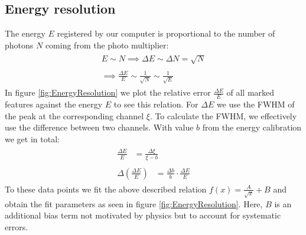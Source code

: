 \subsection{Energy resolution}
%
The energy $E$ registered by our computer is proportional to the number of photons $N$ coming from the photo multiplier:
\begin{align}
    \label{eq:}
    \begin{split}
        E \sim N \implies \Delta E \sim \Delta N = \sqrt{N}
    \end{split}
    \\
    \label{eq:}
    \begin{split}
        \implies \frac{\Delta E}{E} \sim \frac{1}{\sqrt{N}} \sim \frac{1}{\sqrt{E}}
    \end{split}
\end{align}
%
In figure \ref{fig:EnergyResolution} we plot the relative error $\frac{\Delta E}{E}$ of all marked features against the energy $E$ to see this relation.
For $\Delta E$ we use the FWHM of the peak at the corresponding channel $\xi$.
To calculate the FWHM, we effectively use the difference between two channels.
With value $b$ from the energy calibration we get in total:
\begin{align}
    \label{eq:}
    \begin{split}
        \frac{\Delta E}{E} &= \frac{ \Delta \xi }{\xi - b}
    \end{split}
    \\
    \label{eq:}
    \begin{split}
        \Delta \left ( \frac{\Delta E}{E} \right ) &= \frac{ \Delta b }{ b } \cdot \frac{\Delta E}{E}
    \end{split}
\end{align}
%
To these data points we fit the above described relation $f(x) = \frac{A}{\sqrt{x}} + B$ and obtain the fit parameters as seen in figure \ref{fig:EnergyResolution}.
Here, $B$ is an additional bias term not motivated by physics but to account for systematic errors.
%
\par
%
\minipage{\linewidth}
